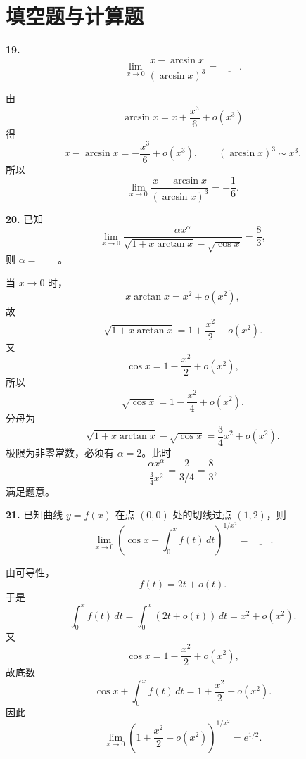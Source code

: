 \section{填空题与计算题}

\begin{problemblock}
\textbf{19.}
\[
\lim_{x\to0}\frac{x-\arcsin x}{(\arcsin x)^3}= \underline{\qquad}.
\]
\end{problemblock}

\begin{solutionblock}
由
\[
\arcsin x=x+\frac{x^3}{6}+o(x^3)
\]
得
\[
x-\arcsin x=-\frac{x^3}{6}+o(x^3),
\qquad
(\arcsin x)^3\sim x^3.
\]
所以
\[
\lim_{x\to0}\frac{x-\arcsin x}{(\arcsin x)^3}
=-\frac16.
\]
\end{solutionblock}

\begin{problemblock}
\textbf{20.} 已知
\[
\lim_{x\to0}
\frac{\alpha x^\alpha}
{\sqrt{1+x\arctan x}-\sqrt{\cos x}}
=\frac83,
\]
则 \(\alpha=\underline{\qquad}\)。
\end{problemblock}

\begin{solutionblock}
当 \(x\to0\) 时，
\[
x\arctan x=x^2+o(x^2),
\]
故
\[
\sqrt{1+x\arctan x}=1+\frac{x^2}{2}+o(x^2).
\]
又
\[
\cos x=1-\frac{x^2}{2}+o(x^2),
\]
所以
\[
\sqrt{\cos x}=1-\frac{x^2}{4}+o(x^2).
\]
分母为
\[
\sqrt{1+x\arctan x}-\sqrt{\cos x}
=\frac{3}{4}x^2+o(x^2).
\]
极限为非零常数，必须有 \(\alpha=2\)。此时
\[
\frac{\alpha x^\alpha}{\frac34x^2}
=\frac{2}{3/4}=\frac83,
\]
满足题意。
\end{solutionblock}

\begin{problemblock}
\textbf{21.} 已知曲线 \(y=f(x)\) 在点 \((0,0)\) 处的切线过点 \((1,2)\)，则
\[
\lim_{x\to0}\left(\cos x+\int_0^x f(t)\,dt\right)^{1/x^2}
=\underline{\qquad}.
\]
\end{problemblock}

\begin{solutionblock}
由可导性，
\[
f(t)=2t+o(t).
\]
于是
\[
\int_0^x f(t)\,dt
=\int_0^x(2t+o(t))\,dt
=x^2+o(x^2).
\]
又
\[
\cos x=1-\frac{x^2}{2}+o(x^2),
\]
故底数
\[
\cos x+\int_0^x f(t)\,dt
=1+\frac{x^2}{2}+o(x^2).
\]
因此
\[
\lim_{x\to0}\left(1+\frac{x^2}{2}+o(x^2)\right)^{1/x^2}
=e^{1/2}.
\]
\end{solutionblock}

